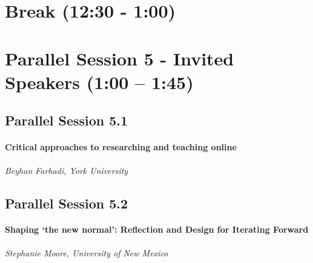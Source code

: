 \documentclass[
]{book}
\begin{document}
\hypertarget{break-1230---100-1}{%
\section*{Break (12:30 - 1:00)}\label{break-1230---100-1}}

\hypertarget{parallel-session-5---invited-speakers-100-145}{%
\section*{Parallel Session 5 - Invited Speakers (1:00 -- 1:45)}\label{parallel-session-5---invited-speakers-100-145}}

\hypertarget{parallel-session-5.1}{%
\subsection*{Parallel Session 5.1}\label{parallel-session-5.1}}

\begin{wp}
\hypertarget{critical-approaches-to-researching-and-teaching-online}{%
\paragraph{Critical approaches to researching and teaching
online}\label{critical-approaches-to-researching-and-teaching-online}}

\emph{Beyhan Farhadi, York University}
\end{wp}

\hypertarget{parallel-session-5.2}{%
\subsection*{Parallel Session 5.2}\label{parallel-session-5.2}}

\begin{wp}
\hypertarget{shaping-the-new-normal-reflection-and-design-for-iterating-forward}{%
\paragraph{Shaping `the new normal': Reflection and Design for Iterating
Forward}\label{shaping-the-new-normal-reflection-and-design-for-iterating-forward}}

\emph{Stephanie Moore, University of New Mexico}
\end{wp}
\end{document}
